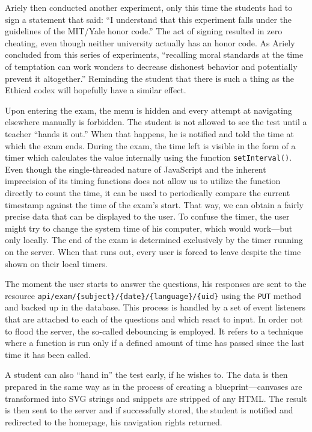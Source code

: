 \documentclass[thesis=M,english,hidelinks]{FITthesis}[2012/10/20]
\newcommand{\code}{\texttt}
\begin{document}
Ariely then conducted another experiment, only this time the students had to sign a statement that said: ``I understand that this experiment falls under the guidelines of the MIT/Yale honor code.'' The act of signing resulted in zero cheating, even though neither university actually has an honor code. As Ariely concluded from this series of experiments, ``recalling moral standards at the time of temptation can work wonders to decrease dishonest behavior and potentially prevent it altogether.'' Reminding the student that there is such a thing as the Ethical codex will hopefully have a similar effect.

Upon entering the exam, the menu is hidden and every attempt at navigating elsewhere manually is forbidden. The student is not allowed to see the test until a teacher ``hands it out.'' When that happens, he is notified and told the time at which the exam ends. During the exam, the time left is visible in the form of a timer which calculates the value internally using the function \code{setInterval()}. Even though the single-threaded nature of JavaScript and the inherent imprecision of its timing functions does not allow us to utilize the function directly to count the time, it can be used to periodically compare the current timestamp against the time of the exam's start. That way, we can obtain a fairly precise data that can be displayed to the user. To confuse the timer, the user might try to change the system time of his computer, which would work---but only locally. The end of the exam is determined exclusively by the timer running on the server. When that runs out, every user is forced to leave despite the time shown on their local timers.

The moment the user starts to answer the questions, his responses are sent to the resource \code{api/exam/\{subject\}/\{date\}/\{language\}/\{uid\}} using the \code{PUT} method and backed up in the database. This process is handled by a set of event listeners that are attached to each of the questions and which react to input. In order not to flood the server, the so-called debouncing is employed. It refers to a technique where a function is run only if a defined amount of time has passed since the last time it has been called.

A student can also ``hand in'' the test early, if he wishes to. The data is then prepared in the same way as in the process of creating a blueprint---canvases are transformed into SVG strings and snippets are stripped of any HTML. The result is then sent to the server and if successfully stored, the student is notified and redirected to the homepage, his navigation rights returned.
\end{document}

